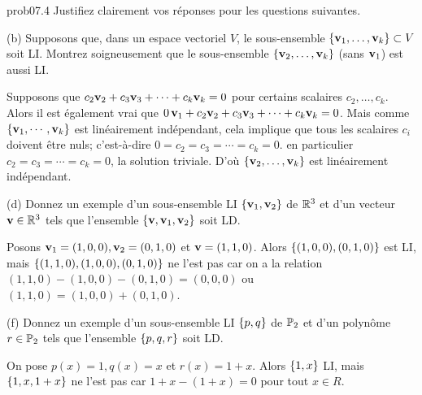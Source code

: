 \bigskip
\begin{sol}{prob07.4} Justifiez clairement vos r\'eponses pour les questions suivantes.\medskip 


(b) Supposons que, dans un espace vectoriel $V$, le sous-ensemble $\{\mathbf{v}_1, \dots , \mathbf{v}_k\}\subset V$ soit LI. Montrez soigneusement que le sous-ensemble $ \{\mathbf{v}_2, \dots , \mathbf{v}_k\}$ (sans $\mathbf{v}_1$) est aussi LI.

\soln Supposons que $c_2\mathbf{v}_2 +c_3 \mathbf{v}_3+ \cdots + c_k \mathbf{v}_k=0$ pour certains scalaires $c_2, \dots , c_k$. Alors il est également vrai que $0\, \mathbf{v}_1 +c_2\mathbf{v}_2 +c_3 \mathbf{v}_3+ \cdots + c_k \mathbf{v}_k=0$. Mais comme $\{\mathbf{v}_1, \cdots , \mathbf{v}_k\}$ est linéairement indépendant, cela implique que tous les scalaires $c_i$ doivent être nuls; c'est-à-dire $0=c_2=c_3=\cdots = c_k=0$. en particulier $c_2=c_3=\cdots = c_k=0$, la solution triviale. D'o\`u $\{\mathbf{v}_2, \dots , \mathbf{v}_k\}$ est linéairement indépendant.

\medskip
 

(d) Donnez un exemple d'un sous-ensemble LI $\{\mathbf{v}_1, \mathbf{v}_2\}$ de $\mathbb{R}^3$ et d'un vecteur $\mathbf{v}\in \mathbb{R}^3$ tels que l'ensemble $\{\mathbf{v}, \mathbf{v}_1, \mathbf{v}_2\}$ soit LD.
 

\soln Posons $\mathbf{v}_1=(1,0,0), \mathbf{v}_2=(0,1,0)$ et $\mathbf{v}=(1,1,0)$. Alors $\{(1,0,0), (0,1,0)\}$ est LI, mais $\{(1,1,0), (1,0,0), (0,1,0)\}$ ne l'est pas car on a la relation $ (1,1,0)- (1,0,0)-(0,1,0)=(0,0,0)$ ou $(1,1,0)= (1,0,0)+(0,1,0)$.

\medskip

(f)  Donnez un exemple d'un sous-ensemble LI $\{p, q\}$ de $\mathbb{P}_2$ et d'un polynôme $r\in \mathbb{P}_2$ tels que l'ensemble $\{p, q, r\}$ soit LD.\medskip

\soln On pose $p(x)=1, q(x)=x$ et $r(x)=1+x$. Alors $\{1, x\}$ LI, mais $\{1, x, 1+x\}$ ne l'est pas car $1 + x -(1+x)=0$ pour tout $x\in R$.

\end{sol}



